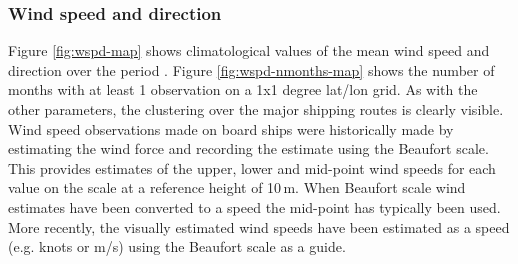 \subsubsection{Wind speed and direction}
Figure \ref{fig:wspd-map} shows climatological values of the mean wind speed and direction over the period \datatimerange{}. 
Figure \ref{fig:wspd-nmonths-map} shows the number of months with at least 1 observation on a 1x1 degree lat/lon grid. 
As with the other parameters, the clustering over the major shipping routes is clearly visible. 
Wind speed observations made on board ships were historically made by estimating the wind force and recording the estimate using the Beaufort scale. 
This provides estimates of the upper, lower and mid-point wind speeds for each value on the scale at a reference height of 10\,m. 
When Beaufort scale wind estimates have been converted to a speed the mid-point has typically been used. 
More recently, the visually estimated wind speeds have been estimated as a speed (e.g. knots or m/s) using the Beaufort scale as a guide. 

